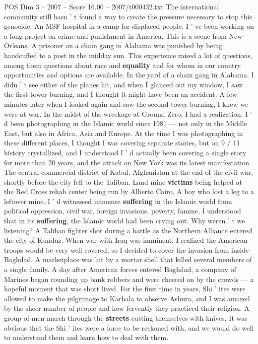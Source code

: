 \begin{textsample}{POS Dim 3 – 2007 – Score 16.00 – 2007/t000432.txt}
The international community still hasn ' t found a way to create the pressure necessary to stop this genocide.
An MSF hospital in a camp for displaced people.
I ' ve been working on a long project on crime and punishment in America.
This is a scene from New Orleans.
A prisoner on a chain gang in Alabama was punished by being handcuffed to a post in the midday sun.
This experience raised a lot of questions, among them questions about race and \textbf{equality} and for whom in our country opportunities and options are available.
In the yard of a chain gang in Alabama.
I didn ' t see either of the planes hit, and when I glanced out my window, I saw the first tower burning, and I thought it might have been an accident.
A few minutes later when I looked again and saw the second tower burning, I knew we were at war.
In the midst of the wreckage at Ground Zero, I had a realization.
I ' d been photographing in the Islamic world since 1981 — not only in the Middle East, but also in Africa, Asia and Europe.
At the time I was photographing in these different places, I thought I was covering separate stories, but on 9 / 11 history crystallized, and I understood I ' d actually been covering a single story for more than 20 years, and the attack on New York was its latest manifestation.
The central commercial district of Kabul, Afghanistan at the end of the civil war, shortly before the city fell to the Taliban.
Land mine \textbf{victims} being helped at the Red Cross rehab center being run by Alberto Cairo.
A boy who lost a leg to a leftover mine.
I ' d witnessed immense \textbf{suffering} in the Islamic world from political oppression, civil war, foreign invasions, poverty, famine.
I understood that in its \textbf{suffering}, the Islamic world had been crying out.
Why weren ' t we listening?
A Taliban fighter shot during a battle as the Northern Alliance entered the city of Kunduz.
When war with Iraq was imminent, I realized the American troops would be very well covered, so I decided to cover the invasion from inside Baghdad.
A marketplace was hit by a mortar shell that killed several members of a single family.
A day after American forces entered Baghdad, a company of Marines began rounding up bank robbers and were cheered on by the crowds — a hopeful moment that was short lived.
For the first time in years, Shi ' ites were allowed to make the pilgrimage to Karbala to observe Ashura, and I was amazed by the sheer number of people and how fervently they practiced their religion.
A group of men march through the \textbf{streets} cutting themselves with knives.
It was obvious that the Shi ' ites were a force to be reckoned with, and we would do well to understand them and learn how to deal with them.

\end{textsample}
